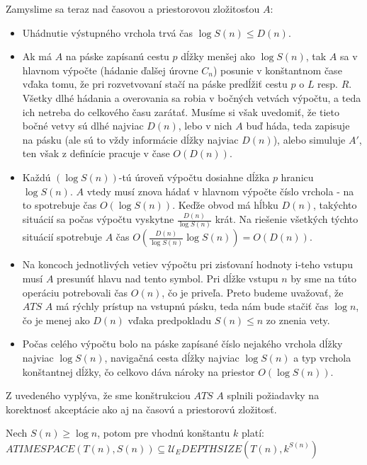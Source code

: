 {\begin{dokaz}
  Zamyslime sa teraz nad časovou a priestorovou zložitosťou $A$:
  \begin{itemize}
    \item Uhádnutie výstupného vrchola trvá čas $\log S(n)\leq D(n)$.
    \item Ak má $A$ na páske zapísanú cestu $p$ dĺžky menšej ako $\log
    S(n)$, tak $A$ sa v hlavnom výpočte (hádanie ďalšej úrovne
    $C_n$) posunie v konštantnom čase vďaka tomu, že pri
    rozvetvovaní stačí na páske predĺžiť cestu $p$ o $L$ resp. $R$.
    Všetky dlhé hádania a overovania sa robia v bočných vetvách
    výpočtu, a teda ich netreba do celkového času zarátať. Musíme si
    však uvedomiť, že tieto bočné vetvy sú dlhé najviac $D(n)$, lebo
    v nich $A$ buď háda, teda zapisuje na pásku (ale sú to vždy informácie
    dĺžky najviac $D(n)$), alebo simuluje $A'$, ten však z definície
    pracuje v čase $O(D(n))$.
    \item Každú $(\log S(n))$-tú úroveň výpočtu dosiahne dĺžka $p$
    hranicu $\log S(n)$. $A$ vtedy musí znova hádať v hlavnom
    výpočte číslo vrchola - na to spotrebuje čas $O(\log S(n))$.
    Keďže obvod má hĺbku $D(n)$, takýchto situácií sa počas výpočtu
    vyskytne $\frac{D(n)}{\log S(n)}$ krát. Na riešenie všetkých týchto
    situácií spotrebuje $A$ čas $O(\frac{D(n)}{\log S(n)} \log S(n))=O(D(n))$.
    \item Na koncoch jednotlivých vetiev výpočtu pri zisťovaní
    hodnoty i-teho vstupu musí $A$ presunúť hlavu nad tento symbol.
    Pri dĺžke vstupu $n$ by sme na túto operáciu potrebovali čas $O(n)$,
    čo je priveľa. Preto budeme uvažovať, že $ATS$ $A$ má rýchly
    prístup na vstupnú pásku, teda nám bude stačiť čas $\log n$, čo
    je menej ako $D(n)$ vďaka predpokladu $S(n)\leq n$ zo znenia
    vety.
    \item Počas celého výpočtu bolo na páske zapísané číslo nejakého
    vrchola dĺžky najviac $\log S(n)$, navigačná cesta dĺžky najviac
    $\log S(n)$ a typ vrchola konštantnej dĺžky, čo celkovo dáva
    nároky na priestor $O(\log S(n))$.
  \end{itemize}
  Z uvedeného vyplýva, že sme konštrukciou $ATS$ $A$ splnili
  požiadavky na korektnosť akceptácie ako aj na časovú a priestorovú
  zložitosť.
\end{dokaz}

\begin{veta}
Nech $S(n)\geq\log n$, potom pre vhodnú konštantu $k$ platí:\newline
$ATIMESPACE(T(n),S(n))\subseteq\mathcal{U}_E
DEPTHSIZE(T(n),k^{S(n)})$
\end{veta}

}
